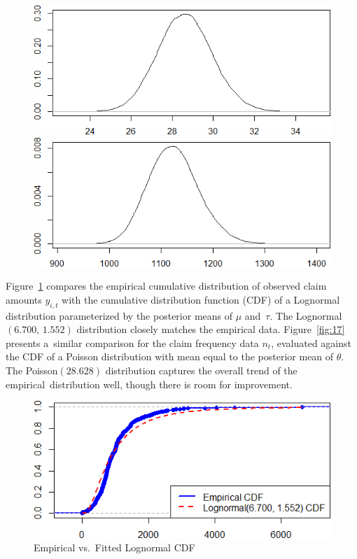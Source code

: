 \documentclass{Class/julia}
\begin{document}
\begin{figure}[!ht]
    \begin{minipage}{0.45\textwidth}
        \centering
        \includegraphics[width=\textwidth]{itamtplcost/density_theta.png}
        \subcaption{\( \theta \)}
    \end{minipage}%
    \hfill
    \begin{minipage}{0.45\textwidth}
        \centering
        \includegraphics[width=\textwidth]{itamtplcost/density_E_y.png}
    \end{minipage}
    
\end{figure}

Figure~\ref{fig:16} compares the empirical cumulative distribution of observed claim amounts \( y_{i,t} \) with the cumulative distribution function (CDF) of a Lognormal distribution parameterized by the posterior means of \( \mu \) and~\( \tau \). The Lognormal\((6.700,\,1.552)\) distribution closely matches the empirical data. Figure~\ref{fig:17} presents a~similar comparison for the claim frequency data \( n_t \), evaluated against the CDF of a Poisson distribution with mean equal to the posterior mean of \( \theta \). The Poisson\((28.628)\) distribution captures the overall trend of the empirical~distribution well, though there is room for improvement.

\begin{figure}[!ht]
    \centering
    \caption{Empirical vs.\ Fitted Lognormal CDF}
    \label{fig:16}
    \includegraphics[width=.7\textwidth]{itamtplcost/empirical_vs_lognormal.png}
\end{figure}
\end{document}
